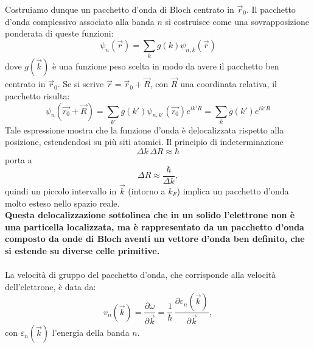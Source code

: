 Costruiamo dunque un pacchetto d'onda di Bloch centrato in \(\vec{r}_0\). Il pacchetto d'onda complessivo associato alla banda \(n\) si costruisce come una sovrapposizione ponderata di queste funzioni:
\[
\psi_n(\vec{r}) = \sum_k g(k)\psi_{n,k}(\vec{r})
\]
dove \(g(\vec{k})\) è una funzione peso scelta in modo da avere il pacchetto ben centrato in \(\vec{r}_0\). Se si scrive \(\vec{r} = \vec{r}_0 + \vec{R}\), con \(\vec{R}\) una coordinata relativa, il pacchetto risulta:
\[
\psi_n(\vec{r_0}+\vec{R}) = \sum_{k'} g(k')\psi_{n,k'}(\vec{r_0})e^{ik'R} = \sum_k \overline{g}(k')e^{ik'R}\]
 Tale espressione mostra che la funzione d'onda è delocalizzata rispetto alla posizione, estendendosi su più siti atomici. Il principio di indeterminazione
\[
\Delta k \, \Delta R \approx \hbar
\]
porta a
\[
\Delta R \approx \frac{\hbar}{\Delta k},
\]
quindi un piccolo intervallo in \(\vec{k}\) (intorno a \(k_F\)) implica un pacchetto d'onda molto esteso nello spazio reale.\\
\textbf{Questa delocalizzazione sottolinea che in un solido l'elettrone non è una particella localizzata, ma è rappresentato da un pacchetto d'onda composto da onde di Bloch aventi un vettore d'onda ben definito, che si estende su diverse celle primitive.}\\\\
La velocità di gruppo del pacchetto d'onda, che corrisponde alla velocità dell'elettrone, è data da:
\[
v_n(\vec{k}) = \frac{\partial \omega}{\partial \vec{k}} = \frac{1}{\hbar}\, \frac{\partial \varepsilon_n(\vec{k})}{\partial \vec{k}},
\]
con \(\varepsilon_n(\vec{k})\) l'energia della banda \(n\).

